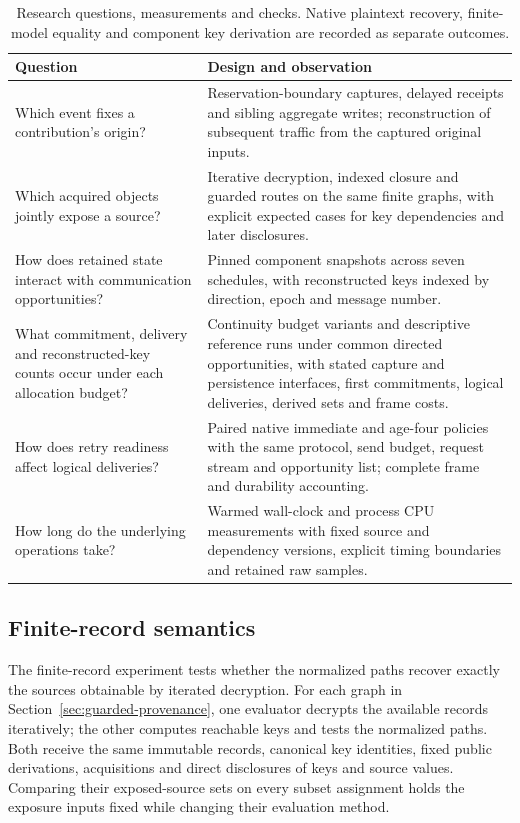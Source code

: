 \documentclass[pdflatex]{sn-jnl}
\theoremstyle{thmstyleone}
\theoremstyle{thmstylethree}
\theoremstyle{thmstyletwo}
\begin{document}
\begin{table}[t]
\centering
\caption{Research questions, measurements and checks. Native plaintext
recovery, finite-model equality and component key derivation are recorded as
separate outcomes.}
\label{tab:validation-questions}
\small
\begin{tabularx}{\linewidth}{@{}>{\raggedright\arraybackslash}p{.30\linewidth}X@{}}
\toprule
Question & Design and observation\\
\midrule
Which event fixes a contribution's origin? &
Reservation-boundary captures, delayed receipts and sibling aggregate writes;
reconstruction of subsequent traffic from the captured original inputs.\\
Which acquired objects jointly expose a source? &
Iterative decryption, indexed closure and guarded routes on the same finite graphs, with
explicit expected cases for key dependencies and later disclosures.\\
How does retained state interact with communication opportunities? &
Pinned component snapshots across seven schedules, with reconstructed keys
indexed by direction, epoch and message number.\\
What commitment, delivery and reconstructed-key counts occur under each allocation budget? &
Continuity budget variants and descriptive reference runs under common
directed opportunities, with stated capture and persistence interfaces,
first commitments, logical deliveries, derived sets and frame costs.\\
How does retry readiness affect logical deliveries? &
Paired native immediate and age-four policies with the same protocol, send
budget, request stream and opportunity list; complete frame and durability
accounting.\\
How long do the underlying operations take? &
Warmed wall-clock and process CPU measurements with fixed source and
dependency versions, explicit timing boundaries and retained raw samples.\\
\bottomrule
\end{tabularx}
\end{table}

\subsection{Finite-record semantics}

\label{sec:guarded-checks}

The finite-record experiment tests whether the normalized paths recover
exactly the sources obtainable by iterated decryption. For each graph
in Section~\ref{sec:guarded-provenance}, one evaluator decrypts the
available records iteratively; the other computes reachable keys and
tests the normalized paths. Both receive the same immutable records,
canonical key identities, fixed public derivations, acquisitions and
direct disclosures of keys and source values. Comparing their
exposed-source sets on every subset assignment holds the exposure inputs
fixed while changing their evaluation method.
\end{document}

